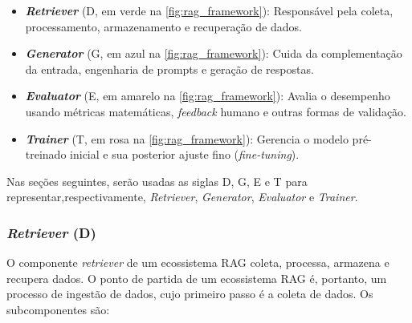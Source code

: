 \documentclass[a4paper, 12pt]{article}
\begin{document}
    \begin{itemize}
        \item \textbf{\textit{Retriever}} (D, em verde na \autoref{fig:rag_framework}): Responsável pela coleta, processamento, armazenamento e recuperação de dados.
        \item \textbf{\textit{Generator}} (G, em azul na \autoref{fig:rag_framework}): Cuida da complementação da entrada, engenharia de prompts e geração de respostas.
        \item \textbf{\textit{Evaluator}} (E, em amarelo na \autoref{fig:rag_framework}): Avalia o desempenho usando métricas matemáticas, \textit{feedback} humano e outras formas de validação.
        \item \textbf{\textit{Trainer}} (T, em rosa na \autoref{fig:rag_framework}): Gerencia o modelo pré-treinado inicial e sua posterior ajuste fino (\textit{fine-tuning}).
    \end{itemize}

    Nas seções seguintes, serão usadas as siglas D, G, E e T para representar,respectivamente, \textit{Retriever}, \textit{Generator}, \textit{Evaluator} e \textit{Trainer}.

    \subsubsection{\textit{Retriever} (D)}

    O componente \textit{retriever} de um ecossistema RAG coleta, processa, armazena e recupera dados. O ponto de partida de um ecossistema RAG é, portanto, um processo de ingestão de dados, cujo primeiro passo é a coleta de dados. Os subcomponentes são:
\end{document}
